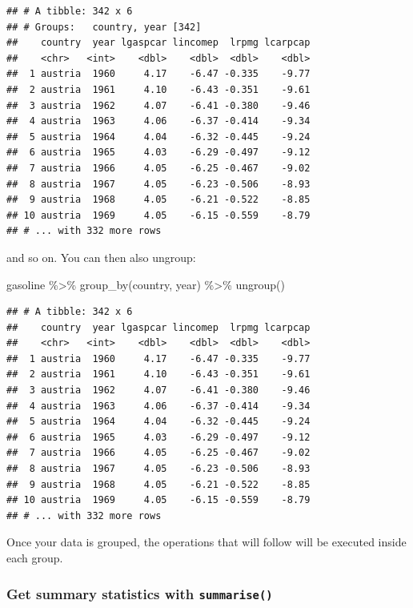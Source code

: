 \documentclass[
]{article}
\newenvironment{Shaded}{\begin{snugshade}}{\end{snugshade}}
\newcommand{\FunctionTok}[1]{\textcolor[rgb]{0.00,0.00,0.00}{#1}}
\newcommand{\NormalTok}[1]{#1}
\newcommand{\SpecialCharTok}[1]{\textcolor[rgb]{0.00,0.00,0.00}{#1}}
\begin{document}
\begin{verbatim}
## # A tibble: 342 x 6
## # Groups:   country, year [342]
##    country  year lgaspcar lincomep  lrpmg lcarpcap
##    <chr>   <int>    <dbl>    <dbl>  <dbl>    <dbl>
##  1 austria  1960     4.17    -6.47 -0.335    -9.77
##  2 austria  1961     4.10    -6.43 -0.351    -9.61
##  3 austria  1962     4.07    -6.41 -0.380    -9.46
##  4 austria  1963     4.06    -6.37 -0.414    -9.34
##  5 austria  1964     4.04    -6.32 -0.445    -9.24
##  6 austria  1965     4.03    -6.29 -0.497    -9.12
##  7 austria  1966     4.05    -6.25 -0.467    -9.02
##  8 austria  1967     4.05    -6.23 -0.506    -8.93
##  9 austria  1968     4.05    -6.21 -0.522    -8.85
## 10 austria  1969     4.05    -6.15 -0.559    -8.79
## # ... with 332 more rows
\end{verbatim}

and so on. You can then also ungroup:

\begin{Shaded}
\begin{Highlighting}[]
\NormalTok{gasoline }\SpecialCharTok{\%\textgreater{}\%}
  \FunctionTok{group\_by}\NormalTok{(country, year) }\SpecialCharTok{\%\textgreater{}\%}
  \FunctionTok{ungroup}\NormalTok{()}
\end{Highlighting}
\end{Shaded}

\begin{verbatim}
## # A tibble: 342 x 6
##    country  year lgaspcar lincomep  lrpmg lcarpcap
##    <chr>   <int>    <dbl>    <dbl>  <dbl>    <dbl>
##  1 austria  1960     4.17    -6.47 -0.335    -9.77
##  2 austria  1961     4.10    -6.43 -0.351    -9.61
##  3 austria  1962     4.07    -6.41 -0.380    -9.46
##  4 austria  1963     4.06    -6.37 -0.414    -9.34
##  5 austria  1964     4.04    -6.32 -0.445    -9.24
##  6 austria  1965     4.03    -6.29 -0.497    -9.12
##  7 austria  1966     4.05    -6.25 -0.467    -9.02
##  8 austria  1967     4.05    -6.23 -0.506    -8.93
##  9 austria  1968     4.05    -6.21 -0.522    -8.85
## 10 austria  1969     4.05    -6.15 -0.559    -8.79
## # ... with 332 more rows
\end{verbatim}

Once your data is grouped, the operations that will follow will be executed inside each group.

\hypertarget{get-summary-statistics-with-summarise}{%
\subsubsection{\texorpdfstring{Get summary statistics with \texttt{summarise()}}{Get summary statistics with summarise()}}\label{get-summary-statistics-with-summarise}}
\end{document}
